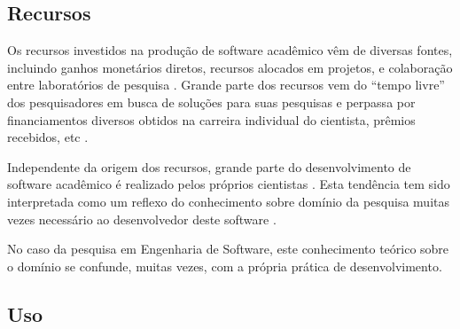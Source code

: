 


\subsection{Recursos}

Os recursos investidos na produção de software acadêmico vêm de diversas
fontes, incluindo ganhos monetários diretos, recursos alocados em projetos, e
colaboração entre laboratórios de pesquisa \cite{howison2015understanding}.
Grande parte dos recursos vem do ``tempo livre'' dos pesquisadores em busca de
soluções para suas pesquisas e perpassa por financiamentos diversos obtidos na
carreira individual do cientista, prêmios recebidos, etc
\cite{howison2015understanding}.

Independente da origem dos recursos, grande parte do desenvolvimento de
software acadêmico é realizado pelos próprios cientistas \cite{hettrick2014uk,
momcheva2015software}.
Esta tendência tem sido interpretada como um reflexo do conhecimento sobre
domínio da pesquisa muitas vezes necessário ao desenvolvedor deste software
\cite{segal2008developing}.

No caso da pesquisa em Engenharia de Software, este conhecimento teórico sobre
o domínio se confunde, muitas vezes, com a própria prática de desenvolvimento.

\subsection{Uso}

